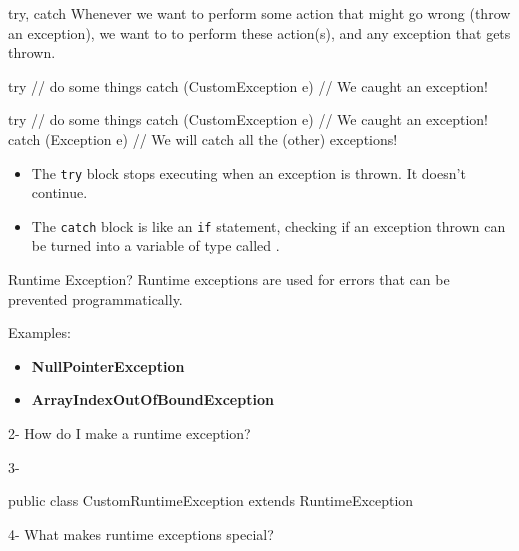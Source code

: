 \documentclass[week4]{csse2002}
\begin{document}
\begin{topic}{try, catch}
Whenever we want to perform some action that might go wrong (throw an exception), we want to  to perform these action(s), and  any exception that gets thrown. 
\begin{subtopic}{1}
\begin{java}
try {
	// do some things
} catch (CustomException  e) {
	// We caught an exception!
}
\end{java}
\end{subtopic}

\begin{subtopic}{2}
\begin{java}
try {
	// do some things
} catch (CustomException  e) {
	// We caught an exception!
} catch (Exception e) {
	// We will catch all the (other) exceptions!
}
\end{java}
\end{subtopic}

\begin{itemize}
\item The \texttt{try} block stops executing when an exception is thrown. It doesn't continue. 
\item The \texttt{catch} block is like an \texttt{if} statement, checking if an exception thrown can be turned into a variable of type  called .
\end{itemize}


\end{topic}

\begin{topic}{Runtime Exception?}
Runtime exceptions are used for errors that can be prevented
programmatically.

Examples: 
\begin{itemize}
	\item \textbf{NullPointerException}
	\item \textbf{ArrayIndexOutOfBoundException}
\end{itemize}

\begin{subtopic}{2-}
How do I make a runtime exception?
\end{subtopic}

\begin{subtopic}{3-}
\begin{java}
public class CustomRuntimeException extends RuntimeException {}
\end{java}
\end{subtopic}

\begin{subtopic}{4-}
What makes runtime exceptions special?
\end{subtopic}
\end{topic}
\end{document}
